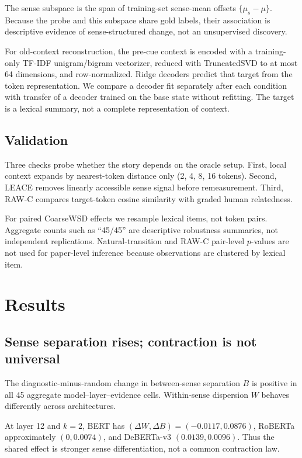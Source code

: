 \documentclass[10pt,twocolumn]{article}
\begin{document}
The sense subspace is the span of training-set sense-mean offsets $\{\mu_s-\mu\}$. Because the probe and this subspace share gold labels, their association is descriptive evidence of sense-structured change, not an unsupervised discovery.

For old-context reconstruction, the pre-cue context is encoded with a training-only TF-IDF unigram/bigram vectorizer, reduced with TruncatedSVD to at most 64 dimensions, and row-normalized. Ridge decoders predict that target from the token representation. We compare a decoder fit separately after each condition with transfer of a decoder trained on the base state without refitting. The target is a lexical summary, not a complete representation of context.

\subsection{Validation}
Three checks probe whether the story depends on the oracle setup. First, local context expands by nearest-token distance only (2, 4, 8, 16 tokens). Second, LEACE \cite{belrose2023} removes linearly accessible sense signal before remeasurement. Third, RAW-C \cite{trott2021} compares target-token cosine similarity with graded human relatedness.

For paired CoarseWSD effects we resample lexical items, not token pairs. Aggregate counts such as ``45/45'' are descriptive robustness summaries, not independent replications. Natural-transition and RAW-C pair-level $p$-values are not used for paper-level inference because observations are clustered by lexical item.

\section{Results}
\subsection{Sense separation rises; contraction is not universal}
The diagnostic-minus-random change in between-sense separation $B$ is positive in all 45 aggregate model--layer--evidence cells. Within-sense dispersion $W$ behaves differently across architectures.

At layer 12 and $k=2$, BERT has $(\Delta W,\Delta B)=(-0.0117,0.0876)$, RoBERTa approximately $(0,0.0074)$, and DeBERTa-v3 $(0.0139,0.0096)$. Thus the shared effect is stronger sense differentiation, not a common contraction law.
\end{document}
